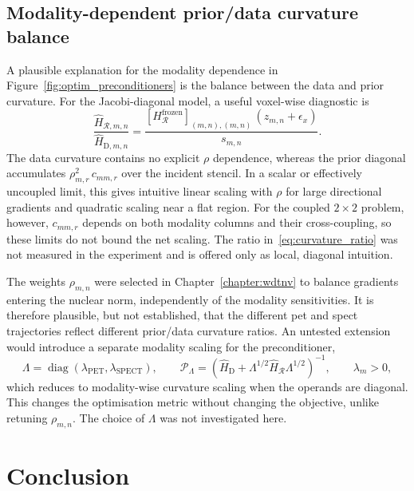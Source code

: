 \subsection{Modality-dependent prior/data curvature balance}
\label{subsec:modality_curvature_balance}

A plausible explanation for the modality dependence in Figure~\ref{fig:optim_preconditioners} is the balance between the data and prior curvature. For the Jacobi-diagonal model, a useful voxel-wise diagnostic is
\begin{equation}
    \frac{\widehat H_{\mathcal R,m,n}}{\widehat H_{\mathrm D,m,n}}
    =
    \frac{\left[H_{\mathcal R}^{\mathrm{frozen}}\right]_{(m,n),(m,n)}\,(z_{m,n}+\epsilon_x)}{s_{m,n}} .
    \label{eq:curvature_ratio}
\end{equation}
The data curvature contains no explicit $\rho$ dependence, whereas the prior diagonal accumulates $\rho_{m,r}^2\,c_{mm,r}$ over the incident stencil. In a scalar or effectively uncoupled limit, this gives intuitive linear scaling with $\rho$ for large directional gradients and quadratic scaling near a flat region. For the coupled $2\times2$ problem, however, $c_{mm,r}$ depends on both modality columns and their cross-coupling, so these limits do not bound the net scaling. The ratio in~\eqref{eq:curvature_ratio} was not measured in the experiment and is offered only as local, diagonal intuition.

The weights $\rho_{m,n}$ were selected in Chapter~\ref{chapter:wdtnv} to balance gradients entering the nuclear norm, independently of the modality sensitivities. It is therefore plausible, but not established, that the different \gls{pet} and \gls{spect} trajectories reflect different prior/data curvature ratios. An untested extension would introduce a separate modality scaling for the preconditioner,
\begin{equation}
    \Lambda
    =
    \operatorname{diag}(\lambda_{\mathrm{PET}},\lambda_{\mathrm{SPECT}}),
    \qquad
    \mathcal P_{\Lambda}
    =
    \left(
        \widehat H_{\mathrm D}
        +
        \Lambda^{1/2}\widehat H_{\mathcal R}\Lambda^{1/2}
    \right)^{-1},
    \qquad \lambda_{m}>0,
    \label{eq:modality_precond_weight}
\end{equation}
which reduces to modality-wise curvature scaling when the operands are diagonal. This changes the optimisation metric without changing the objective, unlike retuning $\rho_{m,n}$. The choice of $\Lambda$ was not investigated here.

\section{Conclusion}
\label{sec:optimisation_conclusion}

